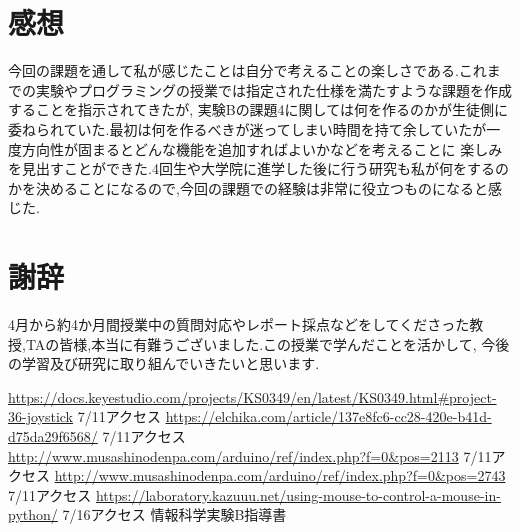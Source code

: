 \documentclass[dvipdfmx]{jarticle}
\begin{document}
\section{感想}
今回の課題を通して私が感じたことは自分で考えることの楽しさである.これまでの実験やプログラミングの授業では指定された仕様を満たすような課題を作成することを指示されてきたが,
実験Bの課題4に関しては何を作るのかが生徒側に委ねられていた.最初は何を作るべきが迷ってしまい時間を持て余していたが一度方向性が固まるとどんな機能を追加すればよいかなどを考えることに
楽しみを見出すことができた.4回生や大学院に進学した後に行う研究も私が何をするのかを決めることになるので,今回の課題での経験は非常に役立つものになると感じた.
\section{謝辞}
4月から約4か月間授業中の質問対応やレポート採点などをしてくださった教授,TAの皆様,本当に有難うございました.この授業で学んだことを活かして,
今後の学習及び研究に取り組んでいきたいと思います.
\begin{thebibliography}{99}
     \url{https://docs.keyestudio.com/projects/KS0349/en/latest/KS0349.html#project-36-joystick} 7/11アクセス
     \url{https://elchika.com/article/137e8fc6-cc28-420e-b41d-d75da29f6568/} 7/11アクセス
     \url{http://www.musashinodenpa.com/arduino/ref/index.php?f=0&pos=2113} 7/11アクセス
     \url{http://www.musashinodenpa.com/arduino/ref/index.php?f=0&pos=2743} 7/11アクセス
     \url{https://laboratory.kazuuu.net/using-mouse-to-control-a-mouse-in-python/} 7/16アクセス
     情報科学実験B指導書
\end{thebibliography}
\end{document}
